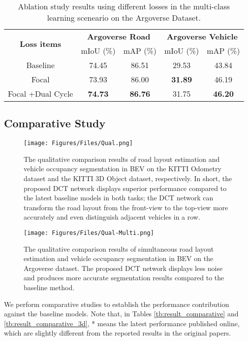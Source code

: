  \begin{table}[!t]
\caption{Ablation study results using different losses in the multi-class learning sceneario on the Argoverse Dataset.}
\label{tb:result_ablation_multiclass}
\begin{center}
\begin{footnotesize}
\begin{tabular}{ccccc}
\toprule
\multicolumn{1}{c}{\multirow{2}[2]{*}{\textbf{Loss items}}} & \multicolumn{2}{c}{\textbf{Argoverse Road}} & \multicolumn{2}{c}{\textbf{Argoverse Vehicle}} \\ 
\cmidrule(lr){2-5}
 & mIoU (\%) & mAP (\%) & mIoU (\%) & mAP (\%)  \\

\midrule
Baseline& 74.45 & 86.51 & 29.53 & 43.84 \\  \midrule
Focal &73.93 & 86.00 & \textbf{31.89} & 46.19\\
Focal +Dual Cycle  &\textbf{74.73}& \textbf{86.76} &31.75&\textbf{46.20}\\
\bottomrule
\end{tabular}
\end{footnotesize}
\end{center}
\end{table}

 
\subsection{Comparative Study}
\begin{figure*}[t]
\begin{center}
   \texttt{[image: Figures/Files/Qual.png]}
\end{center}
   \caption{The qualitative comparison results of road layout estimation and vehicle occupancy segmentation in BEV on the KITTI Odometry dataset and the KITTI 3D Object dataset, respectively. In short, the proposed DCT network displays superior performance compared to the latest baseline models in both tasks; the DCT network can transform the road layout from the front-view to the top-view more accurately and even distinguish adjacent vehicles in a row.}
\label{fig:qual}
\end{figure*} \begin{figure}[t]
\begin{center}
   \texttt{[image: Figures/Files/Qual-Multi.png]}
\end{center}
   \caption{The qualitative comparison results of simultaneous road layout estimation and vehicle occupancy segmentation in BEV on the Argoverse dataset. The proposed DCT network displays less noise and produces more accurate segmentation results compared to the baseline method.}
\label{fig:multiclass_qual}
\end{figure} 
We perform comparative studies to establish the performance contribution against the baseline models. Note that, in Tables \ref{tb:result_comparative} and \ref{tb:result_comparative_3d}, * means the latest performance published online, which are slightly different from the reported results in the original papers.

